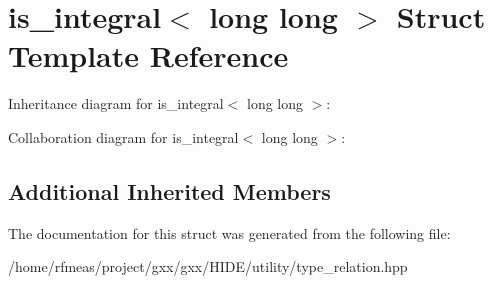\hypertarget{structis__integral_3_01long_01long_01_4}{}\section{is\+\_\+integral$<$ long long $>$ Struct Template Reference}
\label{structis__integral_3_01long_01long_01_4}


Inheritance diagram for is\+\_\+integral$<$ long long $>$\+:


Collaboration diagram for is\+\_\+integral$<$ long long $>$\+:
\subsection*{Additional Inherited Members}


The documentation for this struct was generated from the following file\+:\begin{DoxyCompactItemize}
\item 
/home/rfmeas/project/gxx/gxx/\+H\+I\+D\+E/utility/type\+\_\+relation.\+hpp\end{DoxyCompactItemize}
